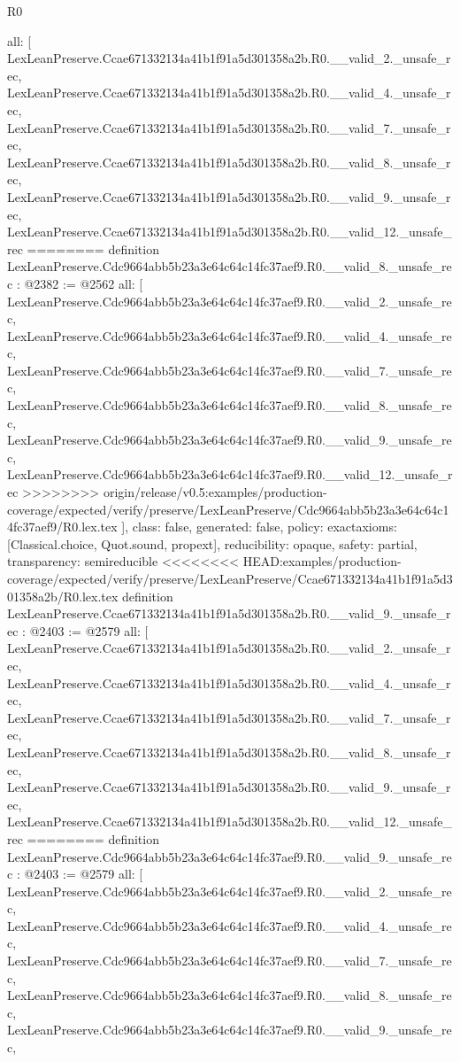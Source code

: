 \begin{lexlean}{R0}
\begin{coremodule}
{{{{{{{{{{{{{{{{{{{{{{{{{{{{{{{{{{{{{{{{{{{{{{{{{{{{{  all: [
    LexLeanPreserve.Ccae671332134a41b1f91a5d301358a2b.R0.__valid_2._unsafe_rec,
    LexLeanPreserve.Ccae671332134a41b1f91a5d301358a2b.R0.__valid_4._unsafe_rec,
    LexLeanPreserve.Ccae671332134a41b1f91a5d301358a2b.R0.__valid_7._unsafe_rec,
    LexLeanPreserve.Ccae671332134a41b1f91a5d301358a2b.R0.__valid_8._unsafe_rec,
    LexLeanPreserve.Ccae671332134a41b1f91a5d301358a2b.R0.__valid_9._unsafe_rec,
    LexLeanPreserve.Ccae671332134a41b1f91a5d301358a2b.R0.__valid_12._unsafe_rec
========
definition LexLeanPreserve.Cdc9664abb5b23a3e64c64c14fc37aef9.R0.__valid_8._unsafe_rec : @2382 := @2562 {
  all: [
    LexLeanPreserve.Cdc9664abb5b23a3e64c64c14fc37aef9.R0.__valid_2._unsafe_rec,
    LexLeanPreserve.Cdc9664abb5b23a3e64c64c14fc37aef9.R0.__valid_4._unsafe_rec,
    LexLeanPreserve.Cdc9664abb5b23a3e64c64c14fc37aef9.R0.__valid_7._unsafe_rec,
    LexLeanPreserve.Cdc9664abb5b23a3e64c64c14fc37aef9.R0.__valid_8._unsafe_rec,
    LexLeanPreserve.Cdc9664abb5b23a3e64c64c14fc37aef9.R0.__valid_9._unsafe_rec,
    LexLeanPreserve.Cdc9664abb5b23a3e64c64c14fc37aef9.R0.__valid_12._unsafe_rec
>>>>>>>> origin/release/v0.5:examples/production-coverage/expected/verify/preserve/LexLeanPreserve/Cdc9664abb5b23a3e64c64c14fc37aef9/R0.lex.tex
  ],
  class: false,
  generated: false,
  policy: exact{axioms: [Classical.choice, Quot.sound, propext]},
  reducibility: opaque{},
  safety: partial,
  transparency: semireducible
}
<<<<<<<< HEAD:examples/production-coverage/expected/verify/preserve/LexLeanPreserve/Ccae671332134a41b1f91a5d301358a2b/R0.lex.tex
definition LexLeanPreserve.Ccae671332134a41b1f91a5d301358a2b.R0.__valid_9._unsafe_rec : @2403 := @2579 {
  all: [
    LexLeanPreserve.Ccae671332134a41b1f91a5d301358a2b.R0.__valid_2._unsafe_rec,
    LexLeanPreserve.Ccae671332134a41b1f91a5d301358a2b.R0.__valid_4._unsafe_rec,
    LexLeanPreserve.Ccae671332134a41b1f91a5d301358a2b.R0.__valid_7._unsafe_rec,
    LexLeanPreserve.Ccae671332134a41b1f91a5d301358a2b.R0.__valid_8._unsafe_rec,
    LexLeanPreserve.Ccae671332134a41b1f91a5d301358a2b.R0.__valid_9._unsafe_rec,
    LexLeanPreserve.Ccae671332134a41b1f91a5d301358a2b.R0.__valid_12._unsafe_rec
========
definition LexLeanPreserve.Cdc9664abb5b23a3e64c64c14fc37aef9.R0.__valid_9._unsafe_rec : @2403 := @2579 {
  all: [
    LexLeanPreserve.Cdc9664abb5b23a3e64c64c14fc37aef9.R0.__valid_2._unsafe_rec,
    LexLeanPreserve.Cdc9664abb5b23a3e64c64c14fc37aef9.R0.__valid_4._unsafe_rec,
    LexLeanPreserve.Cdc9664abb5b23a3e64c64c14fc37aef9.R0.__valid_7._unsafe_rec,
    LexLeanPreserve.Cdc9664abb5b23a3e64c64c14fc37aef9.R0.__valid_8._unsafe_rec,
    LexLeanPreserve.Cdc9664abb5b23a3e64c64c14fc37aef9.R0.__valid_9._unsafe_rec,
}}}}}}}}}}}}}}}}}}}}}}}}}}}}}}}}}}}}}}}}}}}}}}}}}}}}}}}
\end{coremodule}
\end{lexlean}
